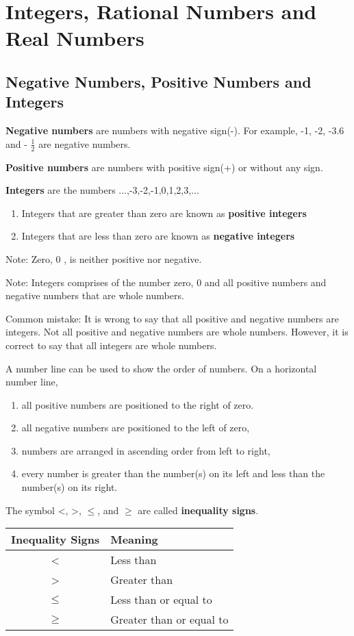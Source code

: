 \documentclass[../main]{subfiles}
\begin{document}
\section{Integers, Rational Numbers and Real Numbers}

\subsection{Negative Numbers, Positive Numbers and Integers}
\textbf{Negative numbers} are numbers with negative sign(-). For example, -1,
-2, -3.6 and - \(\frac 1 2 \) are negative numbers.

\textbf{Positive numbers} are numbers with positive sign(+) or without any sign.

\textbf{Integers} are the numbers ...,-3,-2,-1,0,1,2,3,...
\begin{enumerate}
\item Integers that are greater than zero are known as \textbf{positive
    integers}
\item Integers that are less than zero are known as \textbf{negative integers}
\end{enumerate}

Note: Zero, 0 , is neither positive nor negative.

Note: Integers comprises of the number zero, 0 and all positive numbers and
negative numbers that are whole numbers.

Common mistake:
It is wrong to say that all positive and negative numbers are integers. Not all
positive and negative numbers are whole numbers. However, it is correct to say
that all integers are whole numbers.

A number line can be used to show the order of numbers. On a horizontal number
line,
\begin{enumerate}
\item all positive numbers are positioned to the right of zero.
\item all negative numbers are positioned to the left of zero,
\item numbers are arranged in ascending order from left to right,
\item every number is greater than the number(s) on its left and less than the
  number(s) on its right.
  
\end{enumerate}

The symbol \textless , \textgreater ,  \(\leq\), and \(\geq\) are called \textbf{inequality signs}.
\begin{center}
  \begin{tabular}{| c| l |  }
    \hline
    Inequality Signs & Meaning \\ 
    \hline
    \textless & Less than \\  
    \hline
    \textgreater  & Greater than \\   
    \hline

    \(\leq \) & Less than or equal to \\   
    \hline
    \(\geq \) & Greater than or equal to \\   
    \hline
  \end{tabular}
\end{center}
\end{document}

